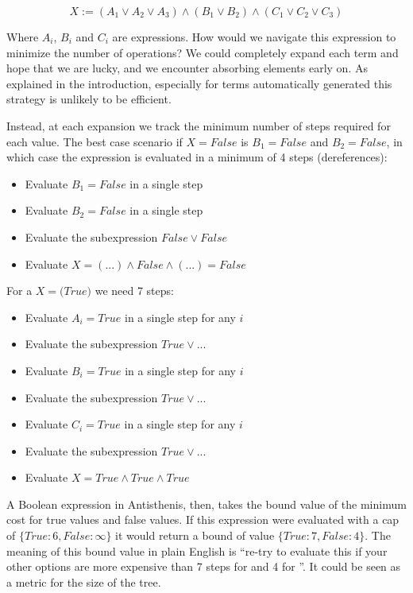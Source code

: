 \[
X := (A_1 \lor A_2 \lor A_3) \land (B_1 \lor B_2) \land (C_1 \lor C_2 \lor C_3)
\]

Where \(A_i\), \(B_i\) and \(C_i\) are expressions. How would we
navigate this expression to minimize the number of operations?  We
could completely expand each term and hope that we are lucky, and we
encounter absorbing elements early on. As explained in the
introduction, especially for terms automatically generated this
strategy is unlikely to be efficient.

Instead, at each expansion we track the minimum number of steps
required for each value. The best case scenario if
\(X = \mathit{False}\) is \(B_1 = \mathit{False}\) and \(B_2 = \mathit{False}\), in
which case the expression is evaluated in a minimum of 4 steps
(dereferences):

\begin{itemize}
\item Evaluate \(B_1 = False\) in a single step
\item Evaluate \(B_2 = False\) in a single step
\item Evaluate the subexpression \(False \lor False\)
\item Evaluate \(X = (...) \land False \land (...) = False\)
\end{itemize}

For a \(X = \mathit(True)\) we need 7 steps:

\begin{itemize}
\item Evaluate \(A_i = True\) in a single step for any \(i\)
\item Evaluate the subexpression \(True \lor ...\)
\item Evaluate \(B_i = True\) in a single step for any \(i\)
\item Evaluate the subexpression \(True \lor ...\)
\item Evaluate \(C_i = True\) in a single step for any \(i\)
\item Evaluate the subexpression \(True \lor ...\)
\item Evaluate \(X = True \land True \land True\)
\end{itemize}

A Boolean expression in Antisthenis, then, takes the bound value of
the minimum cost for true values and false values. If this expression
were evaluated with a cap of \(\{True: 6, False: \infty \}\) it would
return a bound of value \(\{True: 7, False: 4 \}\). The meaning of
this bound value in plain English is ``re-try to evaluate this if your
other options are more expensive than 7 steps for  and 4
for ''. It could be seen as a metric for the size of the
tree.

